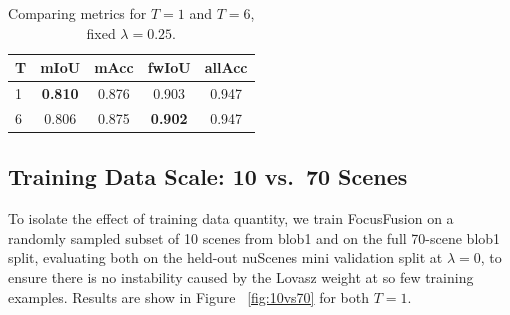 \documentclass[10pt,twocolumn,letterpaper]{article}
\begin{document}
\begin{table}
\begin{center}
\begin{tabular}{|l|c|c|c|c|}
\hline
T & mIoU & mAcc & fwIoU & allAcc\\
\hline\hline
1 & \textbf{0.810} & 0.876 & 0.903 & 0.947\\
6 & 0.806 & 0.875 & \textbf{0.902} & 0.947 \\
\hline
\end{tabular}
\end{center}
\caption{Comparing metrics for $T=1$ and $T=6$, fixed $\lambda=0.25$. }
\label{tab:temporal}
\end{table}

\subsection{Training Data Scale: 10 vs.\ 70 Scenes}
To isolate the effect of training data quantity, we train FocusFusion on a randomly sampled subset of 10 scenes from blob1 and on the full 70-scene blob1 split, evaluating both on the held-out nuScenes mini validation split at $\lambda = 0$, to ensure there is no instability caused by the Lovasz weight at so few training examples. Results are show in Figure  ~\ref{fig:10vs70} for both $T=1$. 
\end{document}
